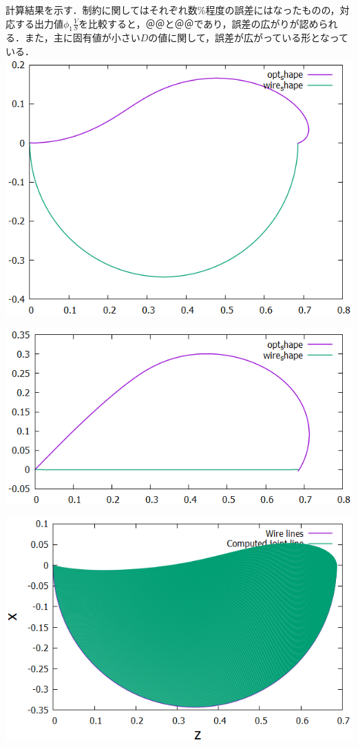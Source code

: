 \documentclass[11pt]{jsarticle}
\begin{document}
			計算結果を示す．制約に関してはそれぞれ数$ \% $程度の誤差にはなったものの，対応する出力値$ \phi_1 \frac{V}{S} $を比較すると，＠＠と＠＠であり，誤差の広がりが認められる．また，主に固有値が小さい$ D $の値に関して，誤差が広がっている形となっている．
			\bfig[H]
				\includegraphics[scale = 0.5]{./figure/AlignWire_xyview.png}
			\efig
			
			\bfig[H]
			\includegraphics[scale = 0.5]{./figure/AlignWire_xzview.png}
			\efig
			
			\bfig[H]
			\includegraphics[scale = 0.5]{./figure/ObtainedRidgeLinefromz-x.png}
			\efig
			
\end{document}
